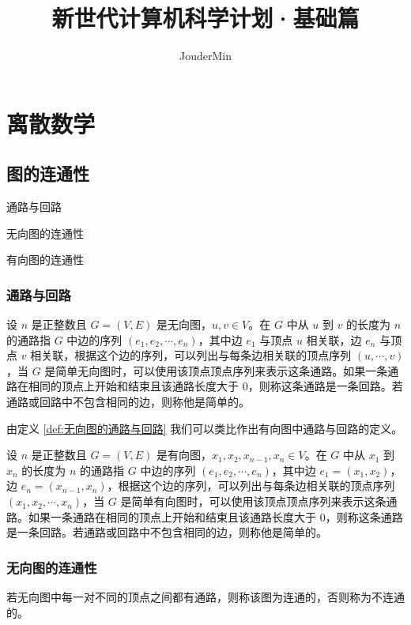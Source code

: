 \documentclass[lang=cn, thmcnt=section, chinesefont=founder, color=cyan, citestyle=gb7714-2015, bibstyle=gb7714-2015]{elegantbook}
\title{新世代计算机科学计划·基础篇}
\author{JouderMin}
\institute{「新世代计算机科学计划」制作委员会}
\date{\zhtoday}
\begin{document}
\maketitle
\frontmatter

\tableofcontents

\mainmatter

\chapter{离散数学}





\section{图的连通性}
\begin{introduction}
    \item 通路与回路
    \item 无向图的连通性
    \item 有向图的连通性
\end{introduction}

\subsection{通路与回路}

\begin{definition}[无向图的通路与回路]\label{def:无向图的通路与回路}
    设 $n$ 是正整数且 $G=(V,E)$ 是无向图，$u,v \in V$。在 $G$ 中从 $u$ 到 $v$ 的长度为 $n$ 的通路指 $G$ 中边的序列 $(e_1,e_2,\cdots,e_n)$，其中边 $e_1$ 与顶点 $u$ 相关联，边 $e_n$ 与顶点 $v$ 相关联，根据这个边的序列，可以列出与每条边相关联的顶点序列 $(u,\cdots,v)$，当 $G$ 是简单无向图时，可以使用该顶点顶点序列来表示这条通路。如果一条通路在相同的顶点上开始和结束且该通路长度大于 $0$，则称这条通路是一条回路。若通路或回路中不包含相同的边，则称他是简单的。
\end{definition}

由定义 \ref{def:无向图的通路与回路} 我们可以类比作出有向图中通路与回路的定义。

\begin{definition}[有向图的通路与回路]\label{def:有向图的通路与回路}
    设 $n$ 是正整数且 $G=(V,E)$ 是有向图，$x_1,x_2,x_{n-1},x_n \in V$。在 $G$ 中从 $x_1$ 到 $x_n$ 的长度为 $n$ 的通路指 $G$ 中边的序列 $(e_1,e_2,\cdots,e_n)$，其中边 $e_1 = (x_1,x_2)$，边 $e_n = (x_{n-1},x_n)$，根据这个边的序列，可以列出与每条边相关联的顶点序列 $(x_1,x_2,\cdots,x_n)$，当 $G$ 是简单有向图时，可以使用该顶点顶点序列来表示这条通路。如果一条通路在相同的顶点上开始和结束且该通路长度大于 $0$，则称这条通路是一条回路。若通路或回路中不包含相同的边，则称他是简单的。
\end{definition}

\subsection{无向图的连通性}
\begin{definition}[无向图的连通性]\label{def:无向图的连通性}
    若无向图中每一对不同的顶点之间都有通路，则称该图为连通的，否则称为不连通的。
\end{definition}
\end{document}
